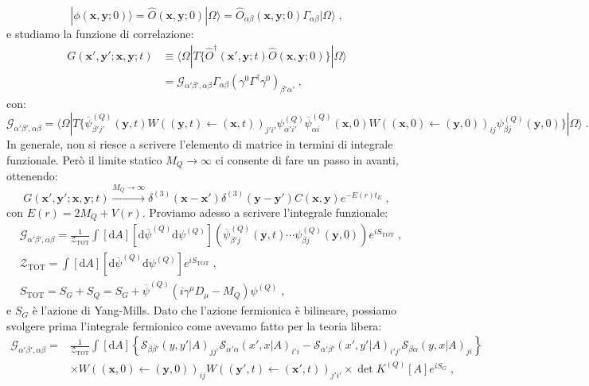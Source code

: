 \documentclass[12pt,a4paper]{article}
\theoremstyle{definition}
\newcommand{\diff}[1][]{\mathrm{d}#1}
\newcommand{\bra}{\langle}
\newcommand{\ket}{\rangle}
\newcommand{\adj}[1]{#1^{\dagger}}
\newcommand{\zpart}{\mathcal{Z}}
\numberwithin{equation}{section}
\begin{document}
$$
|\phi(\mathbf{x},\mathbf{y};0)\ket=\hat{O}(\mathbf{x},\mathbf{y};0)|\Omega\ket=\hat{O}_{\alpha\beta}(\mathbf{x},\mathbf{y};0)\Gamma_{\alpha\beta}|\Omega\ket\;,
$$
e studiamo la funzione di correlazione:
\begin{align*}
G(\mathbf{x}',\mathbf{y}';\mathbf{x},\mathbf{y};t) &\equiv \bra\Omega|T\{\adj{\hat{O}}(\mathbf{x}',\mathbf{y};t)\hat{O}(\mathbf{x},\mathbf{y};0)\}|\Omega\ket \\
&= \mathcal{G}_{\alpha'\beta',\alpha\beta}\Gamma_{\alpha\beta}\left(\gamma^0\adj{\Gamma}\gamma^0\right)_{\beta'\alpha'}\;,
\end{align*}
con:
\begin{equation}
\mathcal{G}_{\alpha'\beta',\alpha\beta}=\bra\Omega|T\{\overline{\psi}_{\beta'j'}^{(Q)}(\mathbf{y},t)W((\mathbf{y},t)\leftarrow(\mathbf{x},t))_{j'i'}\psi_{\alpha'i'}^{(Q)}\overline{\psi}_{\alpha i}^{(Q)}(\mathbf{x},0)W((\mathbf{x},0)\leftarrow(\mathbf{y},0))_{ij}\psi_{\beta j}^{(Q)}(\mathbf{y},0)\}|\Omega\ket\;.
\end{equation}
In generale, non si riesce a scrivere l'elemento di matrice in termini di integrale funzionale. Però il limite statico $M_Q\to\infty$ ci consente di fare un passo in avanti, ottenendo:
\begin{equation}
G(\mathbf{x}',\mathbf{y}';\mathbf{x},\mathbf{y};t)\stackrel{M_Q\to\infty}{\longrightarrow}\delta^{(3)}(\mathbf{x}-\mathbf{x}')\delta^{(3)}(\mathbf{y}-\mathbf{y}')C(\mathbf{x},\mathbf{y})e^{-E(r)t_E}\;,
\end{equation}
con $E(r)=2M_Q+V(r)$. Proviamo adesso a scrivere l'integrale funzionale:
\begin{align*}
&\mathcal{G}_{\alpha'\beta',\alpha\beta}=\frac{1}{\zpart_{\mathrm{TOT}}}\int[\diff{A}][\diff{\overline{\psi}}^{(Q)}\diff{\psi}^{(Q)}](\overline{\psi}_{\beta'j}^{(Q)}(\mathbf{y},t)\cdots\psi_{\beta j}^{(Q)}(\mathbf{y},0))e^{iS_{\mathrm{TOT}}}\;, \\
&\zpart_{\mathrm{TOT}}=\int[\diff{A}][\diff{\overline{\psi}}^{(Q)}\diff{\psi}^{(Q)}]e^{iS_{\mathrm{TOT}}}\;, \\
&S_{\mathrm{TOT}}=S_G+S_Q=S_G+\overline{\psi}^{(Q)}(i\gamma^{\mu}D_{\mu}-M_Q)\psi^{(Q)}\;,
\end{align*}
e $S_G$ è l'azione di Yang-Mills. Dato che l'azione fermionica è bilineare, possiamo svolgere prima l'integrale fermionico come avevamo fatto per la teoria libera:
\begin{align*}
\mathcal{G}_{\alpha'\beta',\alpha\beta}=&\frac{1}{\zpart_{\mathrm{TOT}}}\int[\diff{A}]\left\{\mathcal{S}_{\beta\beta'}(y,y'|A)_{jj'}\mathcal{S}_{\alpha'\alpha}(x',x|A)_{i'i}-\mathcal{S}_{\alpha'\beta'}(x',y'|A)_{i'j'}\mathcal{S}_{\beta\alpha}(y,x|A)_{ji}\right\} \\
&\times W((\mathbf{x},0)\leftarrow(\mathbf{y},0))_{ij}W((\mathbf{y}',t)\leftarrow(\mathbf{x}',t))_{j'i'}\times\det K^{(Q)}[A]e^{iS_G}\;,
\end{align*}
\end{document}
